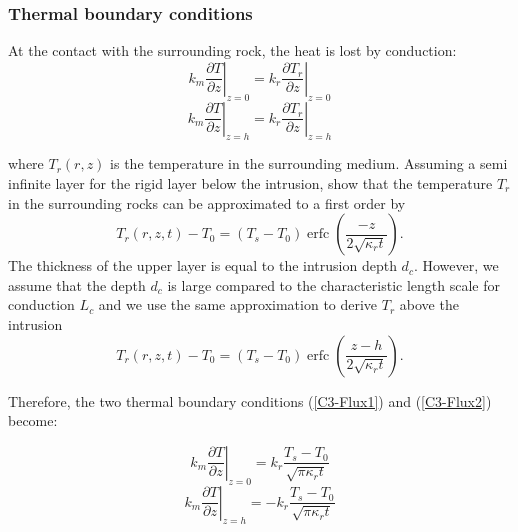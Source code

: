 \subsubsection{Thermal boundary conditions}
\label{C3-sec:thermal-boundary-condition}

At  the  contact with  the  surrounding  rock,  the  heat is  lost  by
conduction:
\begin{equation}
  k_m\left.\frac{\partial                                    T}{\partial
      z}\right|_{z=0}=k_r\left.\frac{\partial              T_r}{\partial
      z}\right|_{z=0}
  \label{C3-Flux1}
\end{equation}
\begin{equation}
  k_m\left.\frac{\partial                                  T}{\partial
      z}\right|_{z=h}=k_r\left.\frac{\partial            T_r}{\partial
      z}\right|_{z=h}
  \label{C3-Flux2}
\end{equation}

where  $T_r(r,z)$  is  the  temperature  in  the  surrounding  medium.
Assuming  a  semi  infinite  layer  for  the  rigid  layer  below  the
intrusion, \citet{Carslaw:1959wf}  show that the temperature  $T_r$ in
the surrounding rocks can be approximated to a first order by
\begin{equation}
  T_r(r,z,t)-T_0=(T_{s}-T_0)\operatorname{erfc}{\left(\frac{-z}{2\sqrt{\kappa_r t}}\right)}.
  \label{eq22}
\end{equation}
The  thickness of  the upper  layer is  equal to  the intrusion  depth
$d_c$. However,  we assume that the  depth $d_c$ is large  compared to
the characteristic  length scale for  conduction $L_c$ and we  use the
same approximation to derive $T_r$ above the intrusion
\begin{equation}
  T_r(r,z,t)-T_0=(T_{s}-T_0)\operatorname{erfc}{\left(\frac{z-h}{2\sqrt{\kappa_r t}}\right)}.
  \label{eq11}
\end{equation}

Therefore,  the  two  thermal boundary  conditions  (\ref{C3-Flux1})  and
(\ref{C3-Flux2}) become:

\begin{equation}
  k_m\left.\frac{\partial                                    T}{\partial
      z}\right|_{z=0}= k_r
  \frac{T_{s}-T_{0}}{\sqrt{\pi \kappa_r t}}
  \label{C3-Flux_1}
\end{equation}
\begin{equation}
  k_m\left.\frac{\partial                                    T}{\partial
      z}\right|_{z=h}= -k_r
  \frac{T_{s}-T_{0}}{\sqrt{\pi \kappa_r t}}
  \label{C3-Flux_2}
\end{equation}


